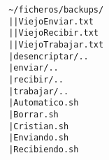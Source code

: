 \texttt{
\textasciitilde/ficheros/backups/\\
\textcolor{white}{.}\hspace{3.15cm}|\hspace{1.8cm}|ViejoEnviar.txt\\
\textcolor{white}{.}\hspace{3.15cm}|\hspace{1.8cm}|ViejoRecibir.txt\\
\textcolor{white}{.}\hspace{3.15cm}|\hspace{1.8cm}|ViejoTrabajar.txt\\
\textcolor{white}{.}\hspace{3.15cm}|desencriptar/..\\
\textcolor{white}{.}\hspace{3.15cm}|enviar/..\\
\textcolor{white}{.}\hspace{3.15cm}|recibir/..\\
\textcolor{white}{.}\hspace{3.15cm}|trabajar/..\\
\textcolor{white}{.}\hspace{3.15cm}|Automatico.sh\\
\textcolor{white}{.}\hspace{3.15cm}|Borrar.sh\\
\textcolor{white}{.}\hspace{3.15cm}|Cristian.sh\\
\textcolor{white}{.}\hspace{3.15cm}|Enviando.sh\\
\textcolor{white}{.}\hspace{3.15cm}|Recibiendo.sh\\
}


